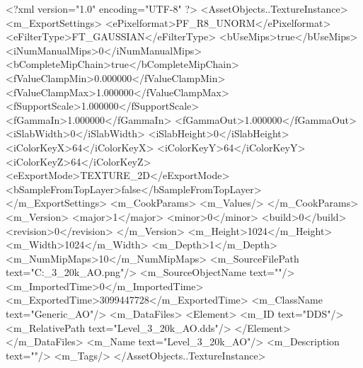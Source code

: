 <?xml version="1.0" encoding="UTF-8" ?>
<AssetObjects..TextureInstance>
	<m_ExportSettings>
		<ePixelformat>PF_R8_UNORM</ePixelformat>
		<eFilterType>FT_GAUSSIAN</eFilterType>
		<bUseMips>true</bUseMips>
		<iNumManualMips>0</iNumManualMips>
		<bCompleteMipChain>true</bCompleteMipChain>
		<fValueClampMin>0.000000</fValueClampMin>
		<fValueClampMax>1.000000</fValueClampMax>
		<fSupportScale>1.000000</fSupportScale>
		<fGammaIn>1.000000</fGammaIn>
		<fGammaOut>1.000000</fGammaOut>
		<iSlabWidth>0</iSlabWidth>
		<iSlabHeight>0</iSlabHeight>
		<iColorKeyX>64</iColorKeyX>
		<iColorKeyY>64</iColorKeyY>
		<iColorKeyZ>64</iColorKeyZ>
		<eExportMode>TEXTURE_2D</eExportMode>
		<bSampleFromTopLayer>false</bSampleFromTopLayer>
	</m_ExportSettings>
	<m_CookParams>
		<m_Values/>
	</m_CookParams>
	<m_Version>
		<major>1</major>
		<minor>0</minor>
		<build>0</build>
		<revision>0</revision>
	</m_Version>
	<m_Height>1024</m_Height>
	<m_Width>1024</m_Width>
	<m_Depth>1</m_Depth>
	<m_NumMipMaps>10</m_NumMipMaps>
	<m_SourceFilePath text="C:\Users\Shadow\Desktop\Prototypes\Level_3_20k_AO.png"/>
	<m_SourceObjectName text=""/>
	<m_ImportedTime>0</m_ImportedTime>
	<m_ExportedTime>3099447728</m_ExportedTime>
	<m_ClassName text="Generic_AO"/>
	<m_DataFiles>
		<Element>
			<m_ID text="DDS"/>
			<m_RelativePath text="Level_3_20k_AO.dds"/>
		</Element>
	</m_DataFiles>
	<m_Name text="Level_3_20k_AO"/>
	<m_Description text=""/>
	<m_Tags/>
</AssetObjects..TextureInstance>

